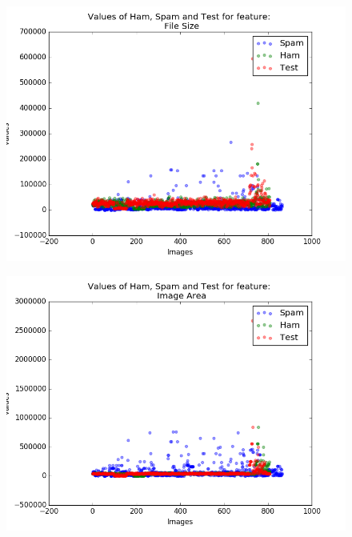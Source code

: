 \begin{figure}[h]
	\centering
	\begin{minipage}{.5\textwidth}
		\centering
		\includegraphics[width=\linewidth]{images/appA/FileSize_values_scatter} 
		\label{fig:FileSize_values_scatter}
	\end{minipage}%
	\begin{minipage}{.5\textwidth}
		\centering
		\includegraphics[width=\linewidth]{images/appA/ImageArea_values_scatter}
		\label{fig:ImageArea_values_scatter}
	\end{minipage}
\end{figure}



